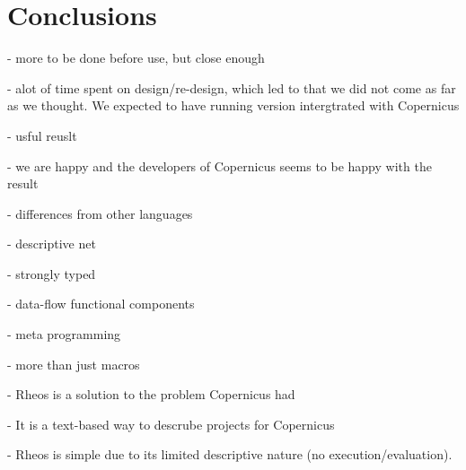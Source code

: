 \chapter{Conclusions}
- more to be done before use, but close enough

- alot of time spent on design/re-design, which led to that we did not
come as far as we thought. We expected to have running version
intergtrated with Copernicus

- usful reuslt

- we are happy and the developers of Copernicus seems to be happy with
the result

- differences from other languages

- descriptive net

- strongly typed

- data-flow functional components

- meta programming

- more than just macros



- Rheos is a solution to the problem Copernicus had

- It is a text-based way to descrube projects for Copernicus

- Rheos is simple due to its limited descriptive nature (no
execution/evaluation).
